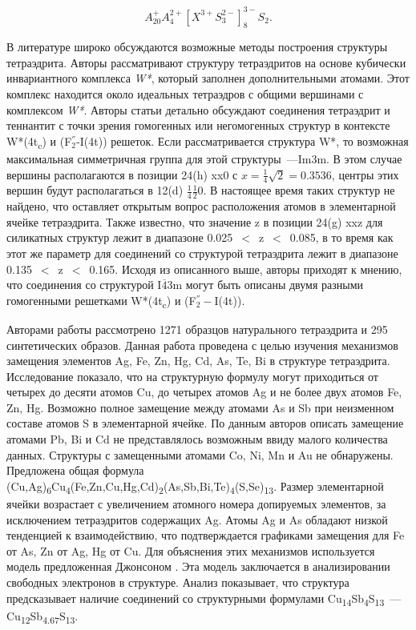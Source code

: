 \begin{equation}
  \label{eq:equation3}
  A^+_{20}A^{2+}_4[X^{3+}S^{2-}_{3}]^{3-}_{8}S_2.
\end{equation}



В литературе широко обсуждаются возможные методы построения структуры тетраэдрита. Авторы \cite{Koch_1981} рассматривают структуру тетраэдритов на основе кубически инвариантного комплекса  \textit{W*}, который заполнен дополнительными атомами. Этот комплекс находится около идеальных тетраэдров с общими вершинами с комплексом \textit{W*}.
Авторы статьи детально обсуждают соединения тетраэдрит и теннантит с точки зрения гомогенных или негомогенных структур в контексте W*(4t\textsubscript{c}) и (F$^{''}_{2}$-I(4t)) решеток.
Если рассматривается структура W*, то возможная максимальная симметричная группа для этой структуры~---Im3m. В этом случае вершины располагаются в позиции 24(h) xx0 с $x = \frac{1}{4}\sqrt{2} = 0.3536$, центры этих вершин будут располагаться в 12(d) $\frac{1}{4}\frac{1}{2}0$.
В настоящее время таких структур не найдено, что оставляет открытым вопрос расположения атомов в элементарной ячейке тетраэдрита.
Также известно, что значение  z в позиции 24(g) xxz для силикатных структур лежит в диапазоне 0.025~$<$~z~$<$~0.085, в то время как этот же параметр для соединений со структурой тетраэдрита лежит в диапазоне 0.135~$<$~z~$<$~0.165.
Исходя из описанного выше, авторы приходят к мнению, что соединения со структурой I$\overline{\!4}$3m могут быть описаны двумя разными гомогенными решетками W*(4t\textsubscript{c}) и (F$^{''}_{2}-$I(4t)).


Авторами работы \cite{Johnson1986} рассмотрено 1271 образцов натурального тетраэдрита и 295 синтетических образов. Данная работа проведена с целью изучения механизмов замещения элементов Ag, Fe, Zn, Hg, Cd, As, Te, Bi в структуре тетраэдрита. Исследование показало, что на структурную формулу могут приходиться от четырех до десяти атомов Cu,  до четырех атомов Ag и не более двух атомов Fe, Zn, Hg. Возможно полное замещение между атомами As и Sb при неизменном составе атомов S в элементарной ячейке.
По данным авторов описать замещение атомами Pb, Bi и Cd не представлялось возможным ввиду малого количества данных. Структуры с замещенными атомами Co, Ni, Mn и Au не обнаружены. Предложена общая формула (Cu,Ag)\textsubscript{6}Cu\textsubscript{4}(Fe,Zn,Cu,Hg,Cd)\textsubscript{2}(As,Sb,Bi,Te)\textsubscript{4}(S,Se)\textsubscript{13}. Размер элементарной ячейки возрастает с увеличением атомного номера допируемых элементов, за исключением тетраэдритов содержащих Ag. Атомы Ag и As обладают низкой тенденцией к взаимодействию, что подтверждается графиками замещения для Fe от As, Zn от Ag, Hg от Cu. Для объяснения этих механизмов используется модель предложенная Джонсоном \cite{johnson1983brillouin}. Эта модель заключается в анализировании свободных электронов в структуре. Анализ показывает, что структура предсказывает наличие соединений со структурными формулами  Cu\textsubscript{14}Sb\textsubscript{4}S\textsubscript{13}~--- Cu\textsubscript{12}Sb\textsubscript{4.67}S\textsubscript{13}.

